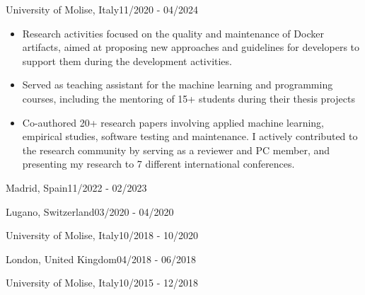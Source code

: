   {University of Molise, Italy}{11/2020 - 04/2024}
   \begin{itemize}
      \item Research activities focused on the quality and maintenance of Docker artifacts, aimed at proposing new approaches and guidelines for developers to support them during the development activities.
      \item Served as teaching assistant for the machine learning and programming courses, including the mentoring of 15+ students during their thesis projects
      \item Co-authored 20+ research papers involving applied machine learning, empirical studies, software testing and maintenance. I actively contributed to the research community by serving as a reviewer and PC member, and presenting my research to 7 different international conferences.
   \end{itemize}

   {Madrid, Spain}{11/2022 - 02/2023}

   {Lugano, Switzerland}{03/2020 - 04/2020}

   {University of Molise, Italy}{10/2018 - 10/2020}

   {London, United Kingdom}{04/2018 - 06/2018}

   {University of Molise, Italy}{10/2015 - 12/2018}